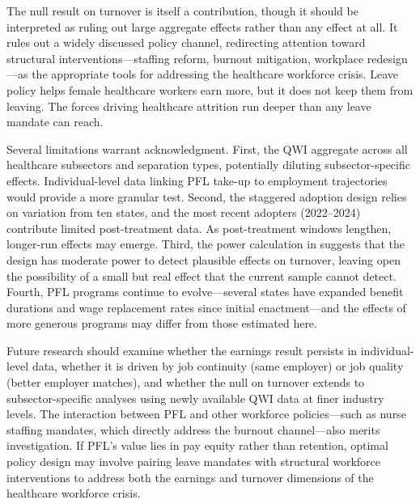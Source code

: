 \documentclass[12pt]{article}
\begin{document}
The null result on turnover is itself a contribution, though it should be interpreted as ruling out large aggregate effects rather than any effect at all. It rules out a widely discussed policy channel, redirecting attention toward structural interventions---staffing reform, burnout mitigation, workplace redesign---as the appropriate tools for addressing the healthcare workforce crisis. Leave policy helps female healthcare workers earn more, but it does not keep them from leaving. The forces driving healthcare attrition run deeper than any leave mandate can reach.

Several limitations warrant acknowledgment. First, the QWI aggregate across all healthcare subsectors and separation types, potentially diluting subsector-specific effects. Individual-level data linking PFL take-up to employment trajectories would provide a more granular test. Second, the staggered adoption design relies on variation from ten states, and the most recent adopters (2022--2024) contribute limited post-treatment data. As post-treatment windows lengthen, longer-run effects may emerge. Third, the power calculation in  suggests that the design has moderate power to detect plausible effects on turnover, leaving open the possibility of a small but real effect that the current sample cannot detect. Fourth, PFL programs continue to evolve---several states have expanded benefit durations and wage replacement rates since initial enactment---and the effects of more generous programs may differ from those estimated here.

Future research should examine whether the earnings result persists in individual-level data, whether it is driven by job continuity (same employer) or job quality (better employer matches), and whether the null on turnover extends to subsector-specific analyses using newly available QWI data at finer industry levels. The interaction between PFL and other workforce policies---such as nurse staffing mandates, which directly address the burnout channel---also merits investigation. If PFL's value lies in pay equity rather than retention, optimal policy design may involve pairing leave mandates with structural workforce interventions to address both the earnings and turnover dimensions of the healthcare workforce crisis.

\label{apep_main_text_end}
\clearpage



\clearpage

\appendix
\renewcommand{\thesection}{Appendix \Alph{section}}
\renewcommand{\thetable}{\Alph{section}\arabic{table}}
\renewcommand{\thefigure}{\Alph{section}\arabic{figure}}
\setcounter{table}{0}
\setcounter{figure}{0}
\end{document}
